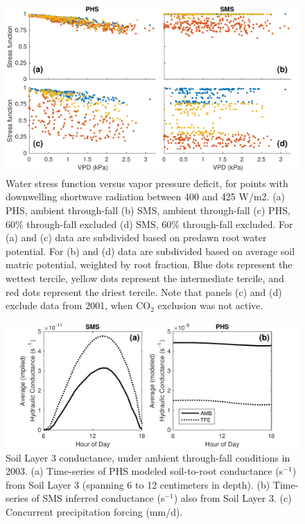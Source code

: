 \documentclass[draft,linenumbers]{agujournal}
\begin{document}
      \clearpage
    \begin{figure}[h]
     \centering
     \includegraphics[width=30pc]{../figs2/fig5.pdf}
     \caption{Water stress function versus vapor pressure deficit, for points with downwelling shortwave radiation between 400 and 425 W/m2.
     (a) PHS, ambient through-fall
     (b) SMS, ambient through-fall
     (c) PHS, 60\% through-fall excluded
     (d) SMS, 60\% through-fall excluded. 
     For (a) and (c) data are subdivided based on predawn root water potential.
     For (b) and (d) data are subdivided based on average soil matric potential, weighted by root fraction.
     Blue dots represent the wettest tercile, yellow dots represent the intermediate tercile, and red dots represent the driest tercile.
     Note that panels (c) and (d) exclude data from 2001, when CO$_2$ exclusion was not active.
     }
     \label{fig:vpd}
       \end{figure}
  
  
\clearpage   
  \begin{figure}[h]
     \centering
     \includegraphics[width=30pc]{../figs3/fig6.pdf}
     \caption{Soil Layer 3 conductance, under ambient through-fall conditions in 2003. 
     (a) Time-series of PHS modeled soil-to-root conductance (s$^{-1}$) from Soil Layer 3 (spanning 6 to 12 centimeters in depth).
     (b) Time-series of SMS inferred conductance (s$^{-1}$) also from Soil Layer 3.
     (c) Concurrent precipitation forcing (mm/d).
     }
     \label{fig:cond}
  \end{figure}
  
\end{document}
